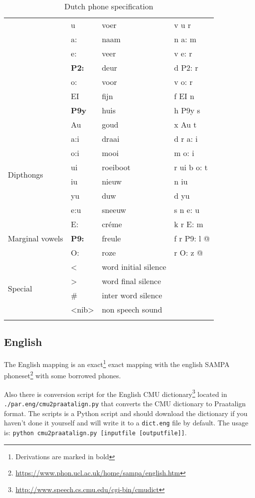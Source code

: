 \begin{longtable}{l|l|l|l}
	& u & voer & v u r\\
	& a: & naam & n a: m\\
	& e: & veer & v e: r\\
	& \textbf{P2:} & deur & d P2: r\\
	& o: & voor & v o: r\\
	& EI & fijn & f EI n\\
	& \textbf{P9y} &huis & h P9y s\\
	& Au & goud & x Au t\\
	\hline
	\multirow{6}{*}{Dipthongs} &
	a:i & draai & d r a: i\\
	& o:i &mooi & m o: i\\
	& ui & roeiboot & r ui b o: t\\
	& iu & nieuw & n iu\\
	& yu & duw & d yu\\
	& e:u & sneeuw & s n e: u\\
	\hline
	\multirow{3}{*}{Marginal vowels} &
	E: & cr\'eme & k r E: m\\
	& \textbf{P9:} & freule & f r P9: l @\\
	& O: & roze & r O: z @\\
	\hline
	\multirow{4}{*}{Special} &
	\textless & word initial silence & \\
	& \textgreater & word final silence & \\
	& \# & inter word silence & \\
	& \textless nib\textgreater & non speech sound & \\
	\hline
	\caption{Dutch phone specification}
\end{longtable}

\subsection{English}
The English mapping is an exact\footnote{Derivations are marked in bold} exact
mapping with the english SAMPA phoneset\footnote{\url{
https://www.phon.ucl.ac.uk/home/sampa/english.htm}} with some borrowed phones.

Also there is conversion script for the English CMU
dictionary\footnote{\url{http://www.speech.cs.cmu.edu/cgi-bin/cmudict}} located
in \texttt{./par.eng/cmu2praatalign.py} that converts the CMU dictionary to
Praatalign format. The scripts is a Python script and should download the
dictionary if you haven't done it yourself and will write it to a
\texttt{dict.eng} file by default. The usage is: \texttt{python
cmu2praatalign.py [inputfile [outputfile]]}.


